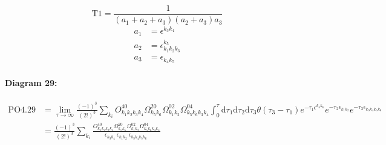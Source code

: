 \documentclass[10pt,a4paper]{article}
\begin{document}
\begin{equation}
\text{T}1 = \frac{1}{(a_1+ a_2+ a_3)(a_2+ a_3)a_3}\end{equation}
\begin{align*}
a_1 &= \epsilon^{k_{3}k_{4}}_{}\\
a_2 &= \epsilon^{k_{5}}_{k_{1}k_{2}k_{3}}\\
a_3 &= \epsilon^{}_{k_{4}k_{5}}
\end{align*}
\paragraph{Diagram 29:}
\begin{align}
\text{PO}4.29
&= \lim\limits_{\tau \to \infty}\frac{(-1)^3 }{(2!)^3}\sum_{k_i}O^{40}_{k_{1}k_{2}k_{3}k_{4}} \Omega^{20}_{k_{5}k_{6}} \Omega^{02}_{k_{1}k_{2}} \Omega^{04}_{k_{5}k_{6}k_{3}k_{4}} \int_{0}^{\tau}\mathrm{d}\tau_1\mathrm{d}\tau_2\mathrm{d}\tau_3\theta(\tau_3-\tau_1) e^{-\tau_1 \epsilon^{k_{5}k_{6}}_{}}e^{-\tau_2 \epsilon^{}_{k_{1}k_{2}}}e^{-\tau_3 \epsilon^{}_{k_{3}k_{4}k_{5}k_{6}}}
 \nonumber \\
&= \frac{(-1)^3 }{(2!)^3}\sum_{k_i}\frac{O^{40}_{k_{1}k_{2}k_{3}k_{4}} \Omega^{20}_{k_{5}k_{6}} \Omega^{02}_{k_{1}k_{2}} \Omega^{04}_{k_{5}k_{6}k_{3}k_{4}} }{\epsilon^{}_{k_{3}k_{4}}\ \epsilon^{}_{k_{1}k_{2}}\ \epsilon^{}_{k_{3}k_{4}k_{5}k_{6}}\ } 
\end{align}
\end{document}
